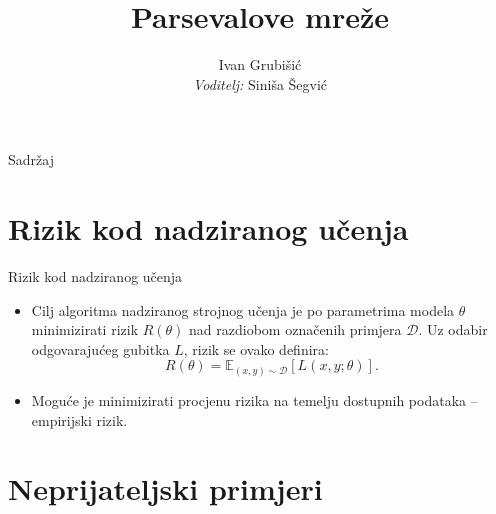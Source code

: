 \documentclass{beamer}
\title{Parsevalove mreže}
\author{Ivan Grubišić \\ \emph{Voditelj:} Siniša Šegvić}
\institute{Fakultet elektrotehnike i računarstva}
\date{}
\begin{document}
	
\begin{frame}
	\titlepage
\end{frame}


\begin{frame}{Sadržaj}
  \tableofcontents
\end{frame}
\note[itemize]{}

\section{Rizik kod nadziranog učenja}

\begin{frame}{Rizik kod nadziranog učenja}	
	\begin{itemize}
		\item Cilj algoritma nadziranog strojnog učenja je po parametrima modela $\theta$ minimizirati rizik $R(\theta)$ nad razdiobom označenih primjera $\mathcal{D}$. Uz odabir odgovarajućeg gubitka $L$, rizik se ovako definira:
		\begin{equation}
		R(\theta) = \mathbb{E}_{(x,y)\sim\mathcal{D}}\left[L(x, y; \theta)\right].
		\end{equation}
		\item Moguće je minimizirati procjenu rizika na temelju dostupnih podataka -- empirijski rizik.
	\end{itemize}
\end{frame}
\note[itemize]{}

\section{Neprijateljski primjeri}
\end{document}
